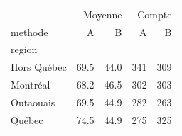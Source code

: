 \begin{tabular}{lrrrr}
\toprule
 & \multicolumn{2}{r}{Moyenne} & \multicolumn{2}{r}{Compte} \\
methode & A & B & A & B \\
region &  &  &  &  \\
\midrule
Hors Québec & 69.5 & 44.0 & 341 & 309 \\
Montréal & 68.2 & 46.5 & 302 & 303 \\
Outaouais & 69.5 & 44.9 & 282 & 263 \\
Québec & 74.5 & 44.9 & 275 & 325 \\
\bottomrule
\end{tabular}
